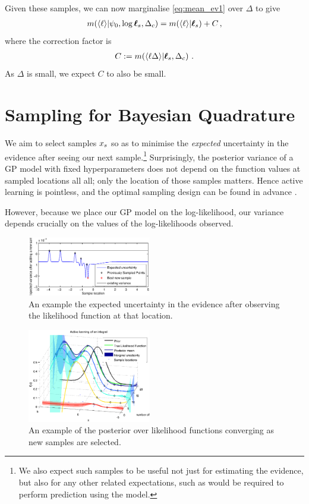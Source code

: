 \documentclass{article}
\begin{document}
Given these samples, we can now marginalise \eqref{eq:mean_ev1} over $\Delta$ to give
\begin{align}
 \mean{\inty{\lfn}}{\psi_0,\tvr_s,\Delta_c} =
\mean{\inty{\lfn}}{\vr_s} + C\,,
\label{eq:mean_ev2}
\end{align}
where the correction factor is
\begin{align*}
 C \deq \mean{\inty{\lfn \Delta}}{\vr_s, \Delta_c}\,.
\end{align*}
As $\Delta$ is small, we expect $C$ to also be small.


\section{Sampling for Bayesian Quadrature}

We aim to select samples $\lfv_s$ so as to minimise the \textit{expected} uncertainty in the evidence after seeing our next sample.\footnote{We also expect such samples to be useful not just for estimating the evidence, but also for any other related expectations, such as would be required to perform prediction using the model.}
Surprisingly, the posterior variance of a GP model with fixed hyperparameters does not depend on the function values at sampled locations all all; only the location of those samples matters. Hence active learning is pointless, and the optimal sampling design can be found in advance \cite{minka2000dqr}.

However, because we place our GP model on the log-likelihood, our variance depends crucially on the values of the log-likelihoods observed. 

\begin{figure}
\centering
\includegraphics[width=0.48\textwidth]{figures/eue.eps}
\caption{An example the expected uncertainty in the evidence after observing the likelihood function at that location.}
\label{fig:eue}
\end{figure}

\begin{figure}
\centering
\includegraphics[width=0.48\textwidth]{figures/active_learning.eps}
\caption{An example of the posterior over likelihood functions converging as new samples are selected.}
\label{fig:active_learning}
\end{figure}
\end{document}
